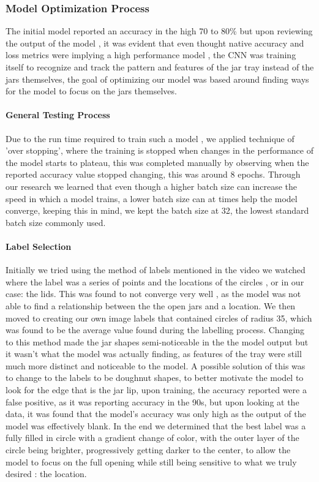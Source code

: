 \documentclass[11pt]{article}
\begin{document}
            \subsubsection{Model Optimization Process}
                The initial model reported an accuracy in the high 70 to 80\% but upon reviewing the output of the model , it was evident that even thought native accuracy and loss metrics were implying a high performance model , the CNN was training itself to recognize and track the pattern and features of the jar tray instead of the jars themselves, the goal of optimizing our model was based around finding ways for the model to focus on the jars themselves.
                \paragraph{General Testing Process}
                Due to the run time required to train such a model , we applied technique of 'over stopping', where the training is stopped when changes in the performance of the model starts to plateau, this was completed manually by observing when the reported accuracy value stopped changing, this was around 8 epochs. Through our research we learned that even though a higher batch size can increase the speed in which a model trains, a lower batch size can at times help the model converge, keeping this in mind, we kept the batch size at 32, the lowest standard batch size commonly used. 
                \paragraph{Label Selection}
                Initially we tried using the method of labels mentioned in the video we watched where the label was a series of points and the locations of the circles , or in our case: the lids. This was found to not converge very well , as the model was not able to find a relationship between the the open jars and a location. We then moved to creating our own image labels that contained circles of radius 35, which was found to be the average value found during the labelling process. Changing to this method made the jar shapes semi-noticeable in the the model output but it wasn't what the model was actually finding, as features of the tray were still much more distinct and noticeable to the model. A possible solution of this was to change to the labels to be doughnut shapes, to better motivate the model to look for the edge that is the jar lip, upon training, the accuracy reported were a false positive, as it was reporting accuracy in the 90s, but upon looking at the data, it was found that the model's accuracy was only high as the output of the model was effectively blank. In the end we determined that the best label was a fully filled in circle with a gradient change of color, with the outer layer of the circle being brighter, progressively getting darker to the center, to allow the model to focus on the full opening while still being sensitive to what we truly desired : the location.
\end{document}
